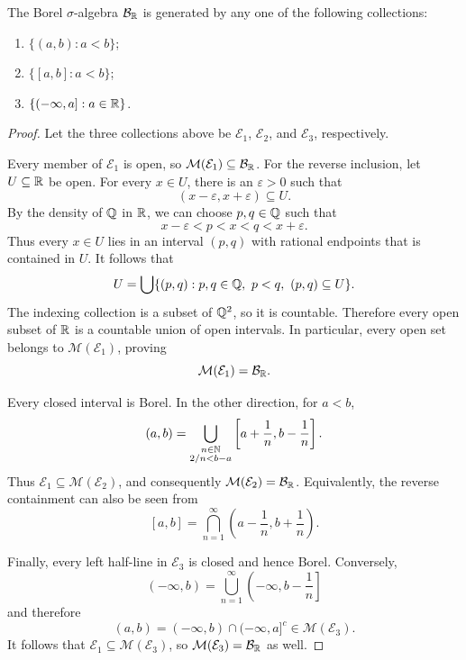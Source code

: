 \begin{proposition}
  The Borel $\sigma$-algebra $\mathcal B_{\mathbb{R}}$ is generated by any one
  of the following collections:
  \begin{enumerate}[label=(\alph*)]
    \item $\{(a,b):a<b\}$;
    \item $\{[a,b]:a<b\}$;
    \item $\{(-\infty,a]:a\in\mathbb{R}\}$.
  \end{enumerate}
\end{proposition}

\begin{proof}
  Let the three collections above be $\mathcal E_1$, $\mathcal E_2$, and
  $\mathcal E_3$, respectively.

  Every member of $\mathcal E_1$ is open, so
  $\mathcal M(\mathcal E_1)\subseteq\mathcal B_{\mathbb{R}}$. For the reverse
  inclusion, let $U\subseteq\mathbb{R}$ be open. For every $x\in U$, there is
  an $\varepsilon>0$ such that
  \[
    (x-\varepsilon,x+\varepsilon)\subseteq U.
  \]
  By the density of $\mathbb{Q}$ in $\mathbb{R}$, we can choose $p,q\in\mathbb{Q}$
  such that
  \[
    x-\varepsilon<p<x<q<x+\varepsilon.
  \]
  Thus every $x\in U$ lies in an interval $(p,q)$ with rational endpoints
  that is contained in $U$. It follows that
  \[
    U=\bigcup\{(p,q):p,q\in\bb{Q},\ p<q,\ (p,q)\subseteq U\}.
  \]
  The indexing collection is a subset of $\mathbb{Q}^2$, so it is countable.
  Therefore every open subset of $\mathbb{R}$ is a countable union of open
  intervals. In particular, every open set belongs to
  $\mathcal M(\mathcal E_1)$, proving
  \[
    \mathcal M(\mathcal E_1)=\mathcal B_{\mathbb{R}}.
  \]

  Every closed interval is Borel. In the other direction, for $a<b$,
  \[
    (a,b)=\bigcup_{\substack{n\in\mathbb{N}\\2/n<b-a}}
      \left[a+\frac1n,b-\frac1n\right].
  \]
  Thus $\mathcal E_1\subseteq\mathcal M(\mathcal E_2)$, and consequently
  $\mathcal M(\mathcal E_2)=\mathcal B_{\mathbb{R}}$. Equivalently, the reverse
  containment can also be seen from
  \[
    [a,b]=\bigcap_{n=1}^{\infty}
      \left(a-\frac1n,b+\frac1n\right).
  \]

  Finally, every left half-line in $\mathcal E_3$ is closed and hence
  Borel. Conversely,
  \[
    (-\infty,b)=\bigcup_{n=1}^{\infty}
      \left(-\infty,b-\frac1n\right]
  \]
  and therefore
  \[
    (a,b)=(-\infty,b)\cap(-\infty,a]^c
      \in\mathcal M(\mathcal E_3).
  \]
  It follows that $\mathcal E_1\subseteq\mathcal M(\mathcal E_3)$, so
  $\mathcal M(\mathcal E_3)=\mathcal B_{\mathbb{R}}$ as well.
\end{proof}
